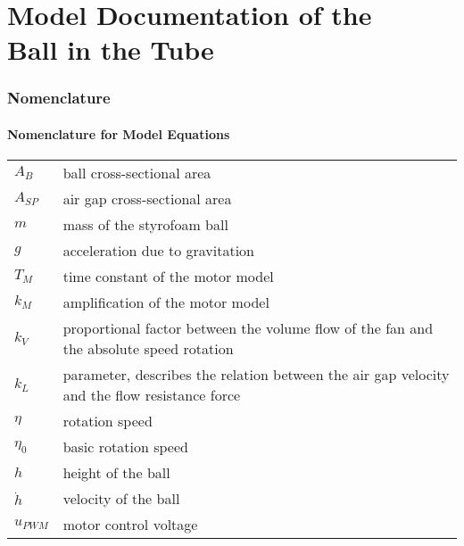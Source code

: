 \documentclass[10pt,a4paper]{article}
\begin{document}
	\part*{Model Documentation of the \\ Ball in the Tube} %
	
	
	\section{Nomenclature} %
	\subsection{Nomenclature for Model Equations} %
	
	\begin{tabular}{ll}
		$A_B$ & ball cross-sectional area \\
		$A_{SP}$ & air gap cross-sectional area \\
		$m$ & mass of the styrofoam ball \\
		$g$ & acceleration due to gravitation \\
		$T_M$ & time constant of the motor model\\
		$k_M$ & amplification of the motor model\\
		$k_V$ & proportional factor between the volume flow of the fan and the absolute speed rotation\\
		$k_L$ & parameter, describes the relation between the air gap velocity and the flow resistance force\\
		$\eta$ & rotation speed \\
		$\eta_0$ & basic rotation speed\\
		$h$ & height of the ball \\
		$\dot{h}$ & velocity of the ball \\
		$u_{PWM}$ & motor control voltage \\
		
				
	\end{tabular}
	 
	
	\begin{tabular}{ll}

	\end{tabular}
	
	
\end{document}
